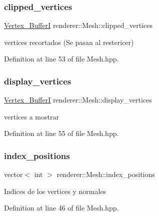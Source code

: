 \subsubsection{\texorpdfstring{clipped\_vertices}{clipped\_vertices}}
{\footnotesize\ttfamily \mbox{\hyperlink{classrenderer_1_1_mesh_ac5074bb370a7062d07e11150de94e8be}{Vertex\+\_\+\+BufferI}} renderer\+::\+Mesh\+::clipped\+\_\+vertices\hspace{0.3cm}{\ttfamily [private]}}

vertices recortados (Se pasan al restericer) 

Definition at line 53 of file Mesh.\+hpp.

\mbox{\label{classrenderer_1_1_mesh_ab375734fbd3ad209425e38f89f64ab5d}} 
\subsubsection{\texorpdfstring{display\_vertices}{display\_vertices}}
{\footnotesize\ttfamily \mbox{\hyperlink{classrenderer_1_1_mesh_ac5074bb370a7062d07e11150de94e8be}{Vertex\+\_\+\+BufferI}} renderer\+::\+Mesh\+::display\+\_\+vertices\hspace{0.3cm}{\ttfamily [private]}}

vertices a mostrar 

Definition at line 55 of file Mesh.\+hpp.

\mbox{\label{classrenderer_1_1_mesh_a67f50b2b651091b38567c8fd69e9e4b3}} 
\subsubsection{\texorpdfstring{index\_positions}{index\_positions}}
{\footnotesize\ttfamily vector$<$ int $>$ renderer\+::\+Mesh\+::index\+\_\+positions\hspace{0.3cm}{\ttfamily [private]}}

Indices de los vertices y normales 

Definition at line 46 of file Mesh.\+hpp.

\mbox{\label{classrenderer_1_1_mesh_a548a365c33a70a93e8a1f7c4085b1ec8}} 

